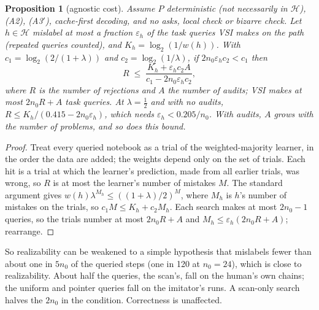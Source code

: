 \documentclass[11pt]{article}
\newtheorem{proposition}[theorem]{Proposition}
\theoremstyle{definition}
\theoremstyle{remark}
\newcommand{\K}{K}
\newcommand{\Hyp}{\mathcal{H}}
\begin{document}
\begin{proposition}[agnostic cost]\label{prop:agnostic}
Assume $P$ deterministic (not necessarily in $\Hyp$), (A2), (A3$'$), cache-first decoding, and no asks, local check or bizarre check. Let $h\in\Hyp$ mislabel at most a fraction $\varepsilon_h$ of the task queries VSI makes on the path (repeated queries counted), and $\K_h=\log_2(1/w(h))$. With $c_1=\log_2(2/(1+\lambda))$ and $c_2=\log_2(1/\lambda)$, if $2n_0\varepsilon_hc_2<c_1$ then
\[ R\;\le\;\frac{\K_h+\varepsilon_hc_2A}{c_1-2n_0\varepsilon_hc_2}, \]
where $R$ is the number of rejections and $A$ the number of audits; VSI makes at most $2n_0R+A$ task queries. At $\lambda=\frac12$ and with no audits, $R\le\K_h/(0.415-2n_0\varepsilon_h)$, which needs $\varepsilon_h<0.205/n_0$. With audits, $A$ grows with the number of problems, and so does this bound.
\end{proposition}
\begin{proof}
Treat every queried notebook as a trial of the weighted-majority learner, in the order the data are added; the weights depend only on the set of trials. Each hit is a trial at which the learner's prediction, made from all earlier trials, was wrong, so $R$ is at most the learner's number of mistakes $M$. The standard argument \cite{lw} gives $w(h)\lambda^{M_h}\le((1+\lambda)/2)^M$, where $M_h$ is $h$'s number of mistakes on the trials, so $c_1M\le\K_h+c_2M_h$. Each search makes at most $2n_0-1$ queries, so the trials number at most $2n_0R+A$ and $M_h\le\varepsilon_h(2n_0R+A)$; rearrange.
\end{proof}
So realizability can be weakened to a simple hypothesis that mislabels fewer than about one in $5n_0$ of the queried steps (one in 120 at $n_0=24$), which is close to realizability. About half the queries, the scan's, fall on the human's own chains; the uniform and pointer queries fall on the imitator's runs. A scan-only search halves the $2n_0$ in the condition. Correctness is unaffected.
\end{document}
